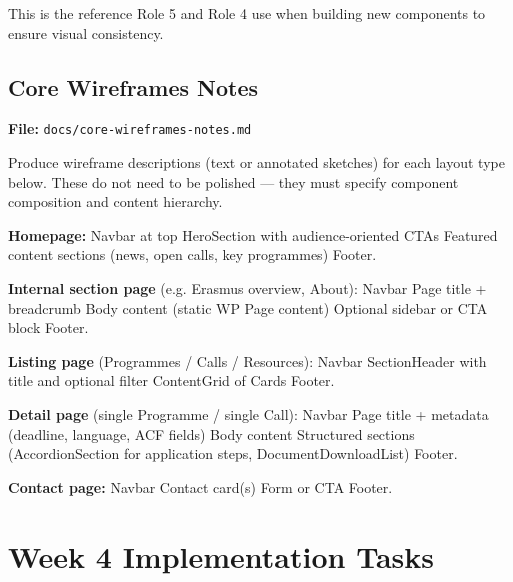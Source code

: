 \documentclass[12pt,a4paper]{article}
\begin{document}
This is the reference Role 5 and Role 4 use when building new components to ensure visual
consistency.

\subsection{Core Wireframes Notes}

\textbf{File:} \texttt{docs/core-wireframes-notes.md}

Produce wireframe descriptions (text or annotated sketches) for each layout type below.
These do not need to be polished --- they must specify component composition and content hierarchy.

\vspace{0.8em}
\noindent\textbf{Homepage:}
Navbar at top \textrightarrow{} HeroSection with audience-oriented CTAs \textrightarrow{} Featured content sections (news, open calls, key programmes) \textrightarrow{} Footer.

\vspace{0.8em}
\noindent\textbf{Internal section page} (e.g. Erasmus overview, About):
Navbar \textrightarrow{} Page title + breadcrumb \textrightarrow{} Body content (static WP Page content) \textrightarrow{} Optional sidebar or CTA block \textrightarrow{} Footer.

\vspace{0.8em}
\noindent\textbf{Listing page} (Programmes / Calls / Resources):
Navbar \textrightarrow{} SectionHeader with title and optional filter \textrightarrow{} ContentGrid of Cards \textrightarrow{} Footer.

\vspace{0.8em}
\noindent\textbf{Detail page} (single Programme / single Call):
Navbar \textrightarrow{} Page title + metadata (deadline, language, ACF fields) \textrightarrow{} Body content \textrightarrow{} Structured sections (AccordionSection for application steps, DocumentDownloadList) \textrightarrow{} Footer.

\vspace{0.8em}
\noindent\textbf{Contact page:}
Navbar \textrightarrow{} Contact card(s) \textrightarrow{} Form or CTA \textrightarrow{} Footer.

\section{Week 4 Implementation Tasks}
\end{document}
